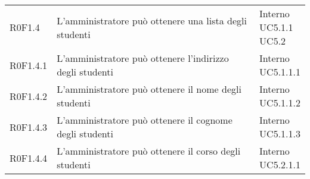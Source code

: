 \documentclass[AnalisiDeiRequisiti.tex]{subfiles}
\begin{document}
\begin{longtable}[H]{p{2cm}p{5.2cm}p{5cm}}
	R0F1.4 & L'amministratore può ottenere una lista degli studenti & \makecell[tl]{
		Interno \\
		UC5.1.1 \\
		UC5.2
	} \\
	R0F1.4.1 & L'amministratore può ottenere l'indirizzo degli studenti & \makecell[tl]{
		Interno \\
		UC5.1.1.1
	} \\
	R0F1.4.2 & L'amministratore può ottenere il nome degli studenti & \makecell[tl]{
		Interno \\
		UC5.1.1.2
	} \\
	R0F1.4.3 & L'amministratore può ottenere il cognome degli studenti & \makecell[tl]{
		Interno \\
		UC5.1.1.3
	} \\
	R0F1.4.4  & L'amministratore può ottenere il corso degli studenti & \makecell[tl]{
		Interno \\
		UC5.2.1.1
	} \\


\end{longtable}
\end{document}
